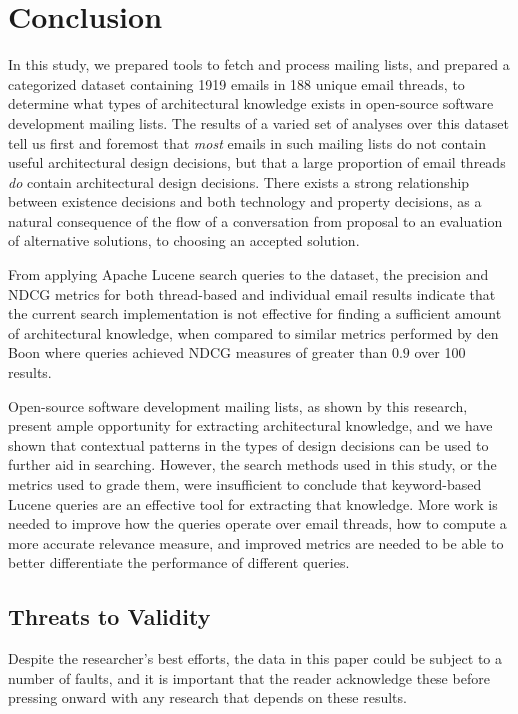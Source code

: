 \documentclass[a4paper, 12pt]{article}
\begin{document}
\section{Conclusion}
	In this study, we prepared tools to fetch and process mailing lists, and prepared a categorized dataset containing 1919 emails in 188 unique email threads, to determine what types of architectural knowledge exists in open-source software development mailing lists. The results of a varied set of analyses over this dataset tell us first and foremost that \textit{most} emails in such mailing lists do not contain useful architectural design decisions, but that a large proportion of email threads \textit{do} contain architectural design decisions. There exists a strong relationship between existence decisions and both technology and property decisions, as a natural consequence of the flow of a conversation from proposal to an evaluation of alternative solutions, to choosing an accepted solution.
	
	From applying Apache Lucene search queries to the dataset, the precision and NDCG metrics for both thread-based and individual email results indicate that the current search implementation is not effective for finding a sufficient amount of architectural knowledge, when compared to similar metrics performed by den Boon\autocite{denboon} where queries achieved NDCG measures of greater than $ 0.9 $ over 100 results.
	
	Open-source software development mailing lists, as shown by this research, present ample opportunity for extracting architectural knowledge, and we have shown that contextual patterns in the types of design decisions can be used to further aid in searching. However, the search methods used in this study, or the metrics used to grade them, were insufficient to conclude that keyword-based Lucene queries are an effective tool for extracting that knowledge. More work is needed to improve how the queries operate over email threads, how to compute a more accurate relevance measure, and improved metrics are needed to be able to better differentiate the performance of different queries.
	
	\subsection{Threats to Validity}
		Despite the researcher's best efforts, the data in this paper could be subject to a number of faults, and it is important that the reader acknowledge these before pressing onward with any research that depends on these results.
		
\end{document}
